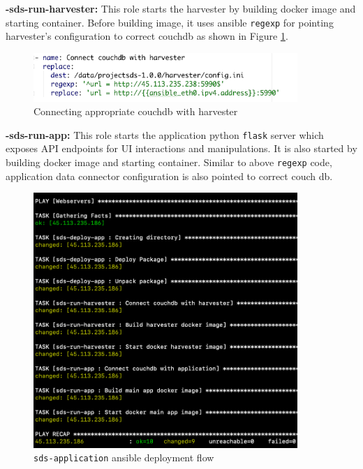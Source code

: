 \textbf{-sds-run-harvester:} This role starts the harvester by building docker image and starting container. Before building image, it uses ansible \texttt{regexp} for pointing harvester's configuration to correct couchdb as shown in Figure \ref{fig:couchharvester}.

\begin{figure}[H]
    \centering
    \includegraphics[width=10cm,keepaspectratio=true]{images/deployment/couch_harvester.png}
    \caption{Connecting appropriate couchdb with harvester}
    \label{fig:couchharvester}
\end{figure}

\textbf{-sds-run-app:} This role starts the application python \texttt{flask} server which exposes API endpoints for UI interactions and manipulations. It is also started by building docker image and starting container. Similar to above \texttt{regexp} code, application data connector configuration is also pointed to correct couch db.

\begin{figure}[H]
    \centering
    \includegraphics[width=10cm,keepaspectratio=true]{images/deployment/app_deployment_ansible.png}
    \caption{\texttt{sds-application} ansible deployment flow}
    \label{fig:appansibledeplyment}
\end{figure}

